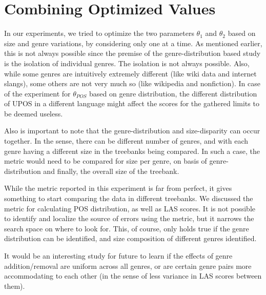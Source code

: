 \section{Combining Optimized Values}

In our experiments, we tried to optimize the two parameters \(\theta_{1}\) and \(\theta_{2}\) based on size and genre variations, by considering only one at a time. As mentioned earlier, this is not always possible since the premise of the genre-distribution based study is the isolation of individual genres. The isolation is not always possible. Also, while some genres are intuitively extremely different (like wiki data and internet slangs), some others are not very much so (like wikipedia and nonfiction). In case of the experiment for \(\theta_{POS}\) based on genre distribution, the different distribution of UPOS in a different language might affect the scores for the gathered limits to be deemed useless.

Also is important to note that the genre-distribution and size-disparity can occur together. In the sense, there can be different number of genres, and with each genre having a different size in the treebanks being compared. In such a case, the metric would need to be compared for size per genre, on basis of genre-distribution and finally, the overall size of the treebank.

While the metric reported in this experiment is far from perfect, it gives something to start comparing the data in different treebanks. We discussed the metric for calculating POS distribution, as well as LAS scores. It is not possible to identify and localize the source of errors using the metric, but it narrows the search space on where to look for. This, of course, only holds true if the genre distribution can be identified, and size composition of different genres identified.

It would be an interesting study for future to learn if the effects of genre addition/removal are uniform across all genres, or are certain genre pairs more accommodating to each other (in the sense of less variance in LAS scores between them).

